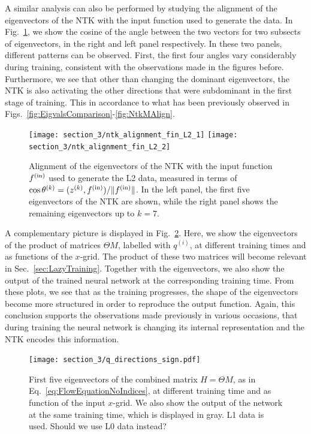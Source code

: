 A similar analysis can also be performed by studying the alignment of the
eigenvectors of the NTK with the input function used to generate the data. In
Fig.~\ref{fig:NTKAlignFin}, we show the cosine of the angle between the two
vectors for two subsects of eigenvectors, in the right and left panel
respectively. In these two panels, different patterns can be observed. First,
the first four angles vary considerably during training, consistent with the
observations made in the figures before. Furthermore, we see that other than
changing the dominant eigenvectors, the NTK is also activating the other
directions that were subdominant in the first stage of training. This in
accordance to what has been previously observed in
Figs.~\ref{fig:EigvalsComparison}-\ref{fig:NtkMAlign}. 

\begin{figure}[ht!]
  \centering
  \texttt{[image: section\_3/ntk\_alignment\_fin\_L2\_1]}
  \texttt{[image: section\_3/ntk\_alignment\_fin\_L2\_2]}
  \caption{Alignment of the eigenvectors of the NTK with the input function
  $f^{\rm(in)}$ used to generate the L2 data, measured in terms of $\cos
  \theta^{(k)} = (z^{(k)}, f^{\rm{(in)}})/ \Vert f^{\rm{(in)}}\Vert$. In the
  left panel, the first five eigenvectors of the NTK are shown, while the right
  panel shows the remaining eigenvectors up to $k=7$.}
  \label{fig:NTKAlignFin}
\end{figure}


A complementary picture is displayed in Fig.~\ref{fig:NTKMEigVecs}. Here, we
show the eigenvectors of the product of matrices $\Theta M$, labelled with
$q^{(i)}$, at different training times and as functions of the $x$-grid. The
product of these two matrices will become relevant in
Sec.~\ref{sec:LazyTraining}. Together with the eigenvectors, we also show the
output of the trained neural network at the corresponding training time. From
these plots, we see that as the training progresses, the shape of the eigenvectors
become more structured in order to reproduce the output function. Again, this
conclusion supports the observations made previously in various occasions, that
during training the neural network is changing its internal representation and
the NTK encodes this information.

\begin{figure}[ht!]
  \centering
  \texttt{[image: section\_3/q\_directions\_sign.pdf]}
  \caption{First five eigenvectors of the combined matrix $H=\Theta M$, as in
  Eq.~\eqref{eq:FlowEquationNoIndices}, at different training time and as
  function of the input $x$-grid. We also show the output of the network at the
  same training time, which is displayed in gray. L1 data is used. \ac{Should we use L0
  data instead?}}
  \label{fig:NTKMEigVecs}
\end{figure}

\FloatBarrier
